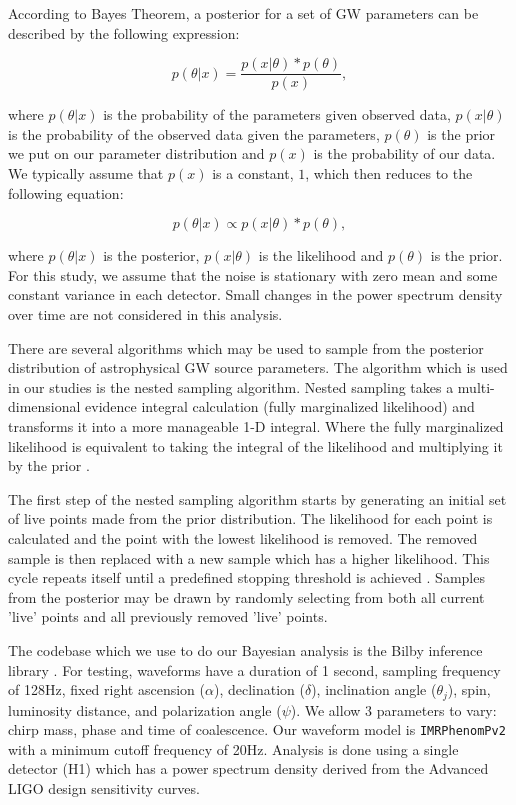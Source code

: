 \documentclass{nature}
\begin{document}
According to Bayes Theorem, a posterior for a set of GW parameters can be described 
by the following expression:

\begin{equation}
    p(\theta|x) = \frac{p(x|\theta) * p(\theta)}{p(x)},
\end{equation}

where $p(\theta|x)$ is the probability of the parameters given observed data, 
$p(x|\theta)$ is the probability of the observed data given the parameters, $p(\theta)$ 
is the prior we put on our parameter distribution and $p(x)$ is the probability of our data. 
We typically assume that $p(x)$ is a constant, $1$, which then reduces to the following equation:

\begin{equation}
    p(\theta|x) \propto p(x|\theta) * p(\theta),
\end{equation}

where $p(\theta|x)$ is the posterior, $p(x|\theta)$ is the likelihood and $p(\theta)$ is the prior. 
For this study, we assume that the noise is stationary with zero mean and some constant variance 
in each detector. Small changes in the power spectrum density over time are not considered in this analysis. 

There are several algorithms which may be used to sample from the posterior distribution 
of astrophysical GW source parameters. The algorithm which is used in our studies is 
the nested sampling algorithm. Nested sampling takes a multi-dimensional evidence 
integral calculation (fully marginalized likelihood) and transforms it into a more 
manageable 1-D integral. Where the fully marginalized likelihood is equivalent to taking 
the integral of the likelihood and multiplying it by the prior \cite{1409.7215}.


The first step of the nested sampling algorithm starts by generating an initial 
set of live points made from the prior distribution. The likelihood for each point 
is calculated and the point with the lowest likelihood is removed. The removed sample 
is then replaced with a new sample which has a higher likelihood. This cycle repeats 
itself until a predefined stopping threshold is achieved \cite{1409.7215}. Samples 
from the posterior may be drawn by randomly selecting from both all current 'live' 
points and all previously removed 'live' points. 

The codebase which we use to do our Bayesian analysis is the Bilby inference library 
\cite{1811.02042}. For testing, waveforms have a duration of 1 second, sampling frequency 
of 128Hz, fixed right ascension ($\alpha$), declination ($\delta$), inclination angle 
($\theta_j$), spin, luminosity distance, and polarization angle ($\psi$). We allow 3 
parameters to vary: chirp mass, phase and time of coalescence. Our waveform model is 
\texttt{IMRPhenomPv2} with a minimum cutoff frequency of 20Hz. Analysis is done using 
a single detector (H1) which has a power spectrum density derived from the Advanced 
LIGO design sensitivity curves.
\end{document}
